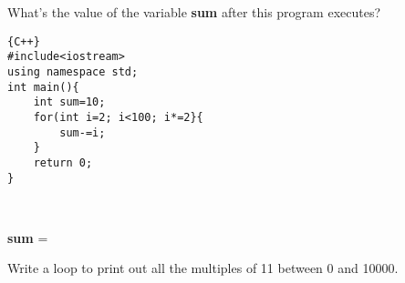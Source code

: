 \documentclass[addpoints,12pt]{exam}
\begin{document}

\begin{center}
\end{center}
\vspace{0.1in}
\begin{center}
\gradetable[h][questions]
\end{center}

\begin{questions}
\question [5]
What's the value of  the variable \textbf{sum} after this program executes?
\begin{lstlisting}{C++}
#include<iostream>
using namespace std;
int main(){
	int sum=10;
	for(int i=2; i<100; i*=2}{
		sum-=i;
	}
	return 0;
}
\end{lstlisting}
\
\begin{center}
	 \textbf{sum} = \underline{\hspace{2cm}}
\end{center}

\question[5]
Write a loop to print out all the multiples of 11 between 0 and 10000.
\end{questions}
\end{document}
